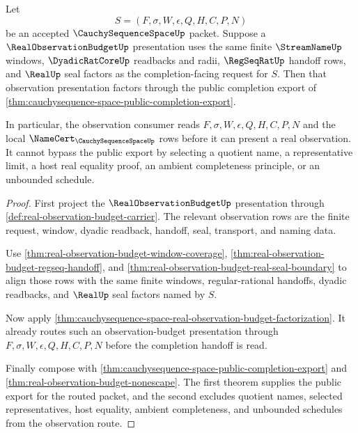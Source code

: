 \begin{theorem}
\label{thm:cauchysequence-space-public-real-observation-consumer}
Let
$$
S=(F,\sigma,W,\epsilon,Q,H,C,P,N)
$$
be an accepted $\CauchySequenceSpaceUp$ packet. Suppose a $\RealObservationBudgetUp$ presentation uses the same finite $\StreamNameUp$ windows, $\DyadicRatCoreUp$ readbacks and radii, $\RegSeqRatUp$ handoff rows, and $\RealUp$ seal factors as the completion-facing request for $S$. Then that observation presentation factors through the public completion export of \autoref{thm:cauchysequence-space-public-completion-export}.

In particular, the observation consumer reads $F,\sigma,W,\epsilon,Q,H,C,P,N$ and the local $\NameCert_{\CauchySequenceSpaceUp}$ rows before it can present a real observation. It cannot bypass the public export by selecting a quotient name, a representative limit, a host real equality proof, an ambient completeness principle, or an unbounded schedule.
\end{theorem}
\begin{proof}
First project the $\RealObservationBudgetUp$ presentation through \autoref{def:real-observation-budget-carrier}. The relevant observation rows are the finite request, window, dyadic readback, handoff, seal, transport, and naming data.

Use \autoref{thm:real-observation-budget-window-coverage}, \autoref{thm:real-observation-budget-regseq-handoff}, and \autoref{thm:real-observation-budget-real-seal-boundary} to align those rows with the same finite windows, regular-rational handoffs, dyadic readbacks, and $\RealUp$ seal factors named by $S$.

Now apply \autoref{thm:cauchysequence-space-real-observation-budget-factorization}. It already routes such an observation-budget presentation through $F,\sigma,W,\epsilon,Q,H,C,P,N$ before the completion handoff is read.

Finally compose with \autoref{thm:cauchysequence-space-public-completion-export} and \autoref{thm:real-observation-budget-nonescape}. The first theorem supplies the public export for the routed packet, and the second excludes quotient names, selected representatives, host equality, ambient completeness, and unbounded schedules from the observation route.
\end{proof}

